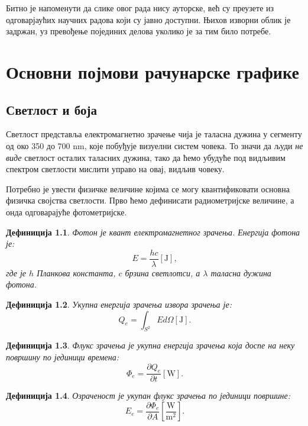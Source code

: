 \documentclass[12pt, a4paper, twoside]{book}
\numberwithin{equation}{chapter}
\numberwithin{theorem}{section}
\newtheorem{definition}{Дефиниција}
\numberwithin{definition}{section}
\numberwithin{definitionChapter}{chapter}
\begin{document}
Битно је напоменути да слике овог рада нису ауторске, већ су преузете из одговарјаућих научних радова
који су јавно доступни. Њихов изворни облик је задржан, уз превођење појединих делова уколико је за
тим било потребе.

\chapter{Основни појмови рачунарске графике}
\section{Светлост и боја}
Светлост представља електромагнетно зрачење чија је таласна дужина у сегменту од око 350 до
700 nm, које побуђује визуелни систем човека. То значи да људи \textit{не виде} светлост
осталих таласних дужина, тако да ћемо убудуће под видљивим спектром светлости мислити управо
на овај, видљив човеку.


Потребно је увести физичке величине којима се могу квантификовати основна физичка својства
светлости. Прво ћемо дефинисати радиометријске величине, а онда одговарајуће фотометријске.

\begin{definition}
	Фотон је квант електромагнетног зрачења. Енергија фотона је:
	$$E=\frac{hc}{\lambda} \left[\mathrm{J}\right],$$ где је $h$ Планкова константа, $c$ брзина светлотси, а $\lambda$ 
	таласна дужина фотона.
\end{definition}

\begin{definition}
	Укупна енергија зрачења извора зрачења је: $$Q_e = \int_{S^2} E d\Omega \left[\mathrm{J}\right].$$
\end{definition}

\begin{definition}
	Флукс зрачења је укупна енергија зрачења која доспе на неку површину по јединици времена:
	$$\Phi_e = \frac{\partial Q_e}{\partial t} \left[\mathrm{W}\right].$$
\end{definition}

\begin{definition}
	Озраченост је укупан флукс зрачења по јединици површине:
	$$E_e = \frac{\partial \Phi_e}{\partial A} \left[\mathrm{\frac{W}{m^2}}\right].$$
\end{definition}
\end{document}
